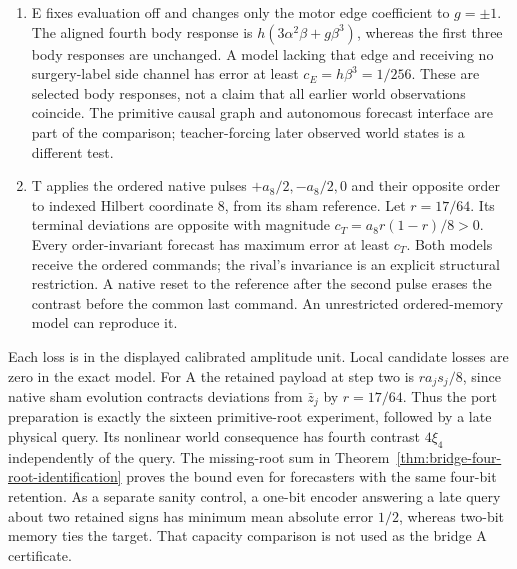 \documentclass[11pt,a4paper]{article}
\theoremstyle{definition}
\begin{document}
\begin{enumerate}[leftmargin=1.5em]
ports. At step three evaluation uses the chosen direction $u=e_1$ or $e_2$;
step four reads the corresponding paired world consequence. The target has
fourth signed contrast $4\xi_4$ for each query, so mean absolute prediction
error against the complete proper-ancestry closure is at least
$c_A=4\xi_4$. Both models may retain all four bits at the same budget; the
restriction is causal ancestry of their forecast, not a one-bit capacity
advantage. A register written during this trial retains the ancestry of
its primitive inputs, rather than becoming an uncharged joint feature when
the query arrives. The same lower bound applies after arbitrary independent
past or randomization. Removing one retained payload before the port fetch
eliminates that primitive cause from the outcome and admits an exact
proper-ancestry forecast.
\item E fixes evaluation off and changes only the motor edge coefficient
to $g=\pm1$. The aligned fourth body response is
$h(3\alpha^2\beta+g\beta^3)$, whereas the first three body responses are
unchanged. A model lacking that edge and receiving no surgery-label side
channel has error at least $c_E=h\beta^3=1/256$. These are selected body
responses, not a claim that all earlier world observations coincide.
The primitive causal graph and autonomous forecast interface are part of
the comparison; teacher-forcing later observed world states is a different test.
\item T applies the ordered native pulses $+a_8/2,-a_8/2,0$ and their
opposite order to indexed Hilbert coordinate 8, from its sham reference.
Let $r=17/64$. Its terminal deviations are opposite with magnitude
$c_T=a_8r(1-r)/8>0$. Every order-invariant forecast has maximum error at
least $c_T$. Both models receive the ordered commands; the rival's
invariance is an explicit structural restriction. A native reset to the
reference after the second pulse erases the contrast before the common
last command. An unrestricted ordered-memory model can reproduce it.
\end{enumerate}

Each loss is in the displayed calibrated amplitude unit. Local candidate
losses are zero in the exact model. For A the retained payload at step two
is $ra_js_j/8$, since native sham evolution contracts deviations from
$\bar z_j$ by $r=17/64$. Thus the port preparation is exactly the sixteen
primitive-root experiment, followed by a late physical query. Its nonlinear
world consequence has fourth contrast $4\xi_4$ independently of the query.
The missing-root sum in Theorem~\ref{thm:bridge-four-root-identification}
proves the bound even for forecasters with the same four-bit retention.
As a separate sanity control, a one-bit encoder answering a late query
about two retained signs has minimum mean absolute error $1/2$, whereas
two-bit memory ties the target. That capacity comparison is not used as
the bridge A certificate.
\end{document}
